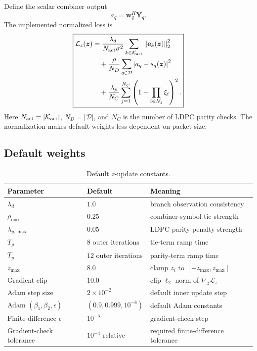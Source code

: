 \documentclass[11pt]{article}
\newcommand{\norm}[1]{\left\lVert #1 \right\rVert}
\newcommand{\abs}[1]{\left\lvert #1 \right\rvert}
\begin{document}
Define the scalar combiner output
\begin{equation}
 a_q=\mathbf w_q^H\mathbf Y_q.
\end{equation}
The implemented normalized loss is
\begin{equation}
\boxed{
\begin{aligned}
\mathcal L_z(\bm z)
&=\frac{\lambda_d}{N_{\rm act}\sigma^2}
\sum_{k\in\mathcal K_{\rm act}}
\norm{\mathbf e_k(\bm z)}_2^2 \\
&\quad +\frac{\rho}{N_D}
\sum_{q\in\mathcal D}
\abs{a_q-s_q(\bm z)}^2 \\
&\quad +\frac{\lambda_p}{N_C}
\sum_{j=1}^{N_C}
\left(1-\prod_{i\in\mathcal N_j}\xi_i\right)^2.
\end{aligned}}
\label{eq:lz}
\end{equation}
Here $N_{\rm act}=|\mathcal K_{\rm act}|$, $N_D=|\mathcal D|$, and $N_C$ is the number of LDPC parity checks.  The normalization makes default weights less dependent on packet size.

\subsection{Default weights}

\begin{table}[h]
\centering
\caption{Default $z$-update constants.}
\begin{tabular}{@{}lll@{}}
\toprule
Parameter & Default & Meaning \\
\midrule
$\lambda_d$ & $1.0$ & branch observation consistency \\
$\rho_{\max}$ & $0.25$ & combiner-symbol tie strength \\
$\lambda_{p,\max}$ & $0.05$ & LDPC parity penalty strength \\
$T_\rho$ & $8$ outer iterations & tie-term ramp time \\
$T_p$ & $12$ outer iterations & parity-term ramp time \\
$z_{\max}$ & $8.0$ & clamp $z_i$ to $[-z_{\max},z_{\max}]$ \\
Gradient clip & $10.0$ & clip $\ell_2$ norm of $\nabla_z\mathcal L_z$ \\
Adam step size & $2\times 10^{-2}$ & default inner update step \\
Adam $(\beta_1,\beta_2,\epsilon)$ & $(0.9,0.999,10^{-8})$ & default Adam constants \\
Finite-difference $\epsilon$ & $10^{-5}$ & gradient-check step \\
Gradient-check tolerance & $10^{-4}$ relative & required finite-difference tolerance \\
\bottomrule
\end{tabular}
\end{table}
\end{document}
